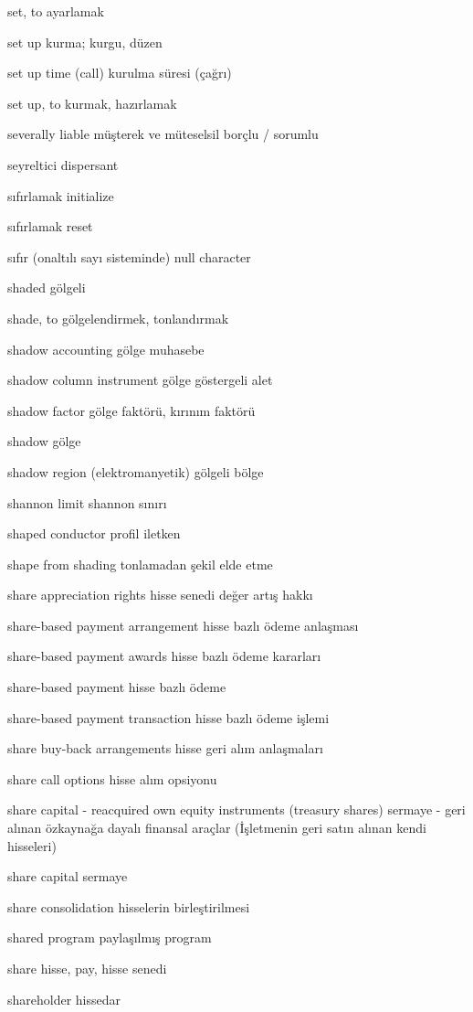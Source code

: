 \documentclass[12pt,fleqn]{article}\usepackage{../../common}
\begin{document}
set, to ayarlamak

set up kurma; kurgu, düzen

set up time (call) kurulma süresi (çağrı)

set up, to kurmak, hazırlamak

severally liable müşterek ve müteselsil borçlu / sorumlu

seyreltici dispersant

sıfırlamak initialize

sıfırlamak reset

sıfır (onaltılı sayı sisteminde) null character

shaded gölgeli

shade, to gölgelendirmek, tonlandırmak

shadow accounting gölge muhasebe

shadow column instrument gölge göstergeli alet

shadow factor gölge faktörü, kırınım faktörü

shadow gölge

shadow region (elektromanyetik) gölgeli bölge

shannon limit shannon sınırı

shaped conductor profil iletken

shape from shading tonlamadan şekil elde etme

share appreciation rights hisse senedi değer artış hakkı

share-based payment arrangement hisse bazlı ödeme anlaşması

share-based payment awards hisse bazlı ödeme kararları

share-based payment hisse bazlı ödeme

share-based payment transaction hisse bazlı ödeme işlemi

share buy-back arrangements hisse geri alım anlaşmaları

share call options hisse alım opsiyonu

share capital - reacquired own equity instruments (treasury shares) sermaye - geri alınan özkaynağa dayalı finansal araçlar (İşletmenin geri satın alınan kendi hisseleri)

share capital sermaye

share consolidation hisselerin birleştirilmesi

shared program paylaşılmış program

share hisse, pay, hisse senedi

shareholder hissedar
\end{document}
